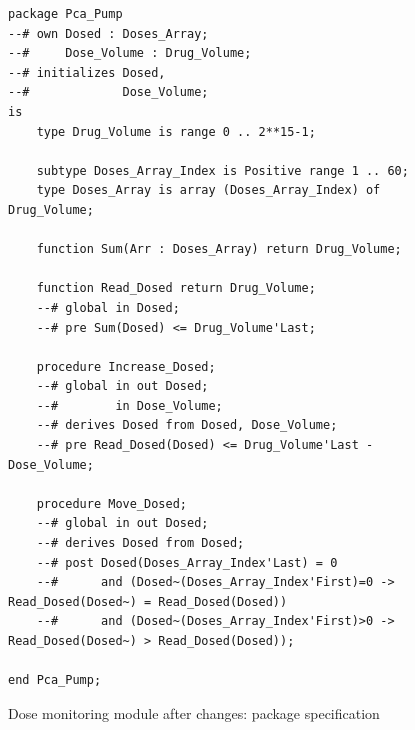 \begin{figure}
\singlespacing
\begin{lstlisting}[frame=single, gobble=0]
package Pca_Pump
--# own Dosed : Doses_Array;
--#     Dose_Volume : Drug_Volume;
--# initializes Dosed,
--#             Dose_Volume;
is
    type Drug_Volume is range 0 .. 2**15-1;

    subtype Doses_Array_Index is Positive range 1 .. 60;
    type Doses_Array is array (Doses_Array_Index) of Drug_Volume;

    function Sum(Arr : Doses_Array) return Drug_Volume;

    function Read_Dosed return Drug_Volume;
    --# global in Dosed;
    --# pre Sum(Dosed) <= Drug_Volume'Last;

    procedure Increase_Dosed;
    --# global in out Dosed;
    --#        in Dose_Volume;
    --# derives Dosed from Dosed, Dose_Volume;
    --# pre Read_Dosed(Dosed) <= Drug_Volume'Last - Dose_Volume;

    procedure Move_Dosed;
    --# global in out Dosed;
    --# derives Dosed from Dosed;
    --# post Dosed(Doses_Array_Index'Last) = 0
    --#      and (Dosed~(Doses_Array_Index'First)=0 -> Read_Dosed(Dosed~) = Read_Dosed(Dosed))
    --#      and (Dosed~(Doses_Array_Index'First)>0 -> Read_Dosed(Dosed~) > Read_Dosed(Dosed));

end Pca_Pump;
\end{lstlisting}
\doublespacing
\caption{Dose monitoring module after changes: package specification}
\label{listing:pcapump_dosemonitor:spark2005_spec}
\end{figure}

